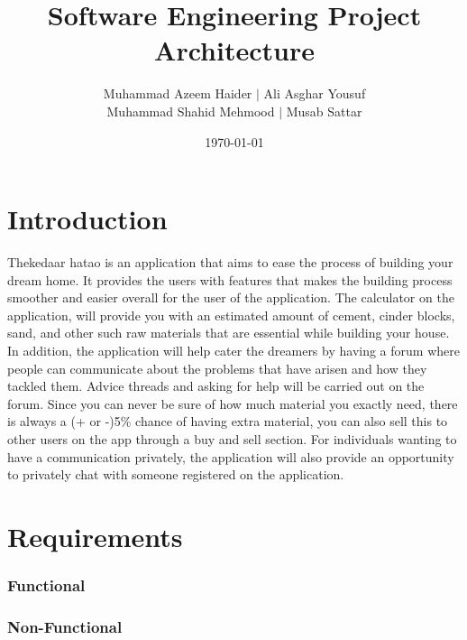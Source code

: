 \documentclass{article}
\title{Software Engineering Project Architecture}
\author{Muhammad Azeem Haider $\mid$ Ali Asghar Yousuf \\
    Muhammad Shahid Mehmood $\mid$ Musab Sattar}
\date{\today}
\begin{document}
\maketitle

\section*{Introduction}

Thekedaar hatao is an application that aims to ease the process of building
your dream home. It provides the users with features that makes the building
process smoother and easier overall for the user of the application. The
calculator on the application, will provide you with an estimated amount of
cement, cinder blocks, sand, and other such raw materials that are essential
while building your house. In addition, the application will help cater the
dreamers by having a forum where people can communicate about the problems that
have arisen and how they tackled them. Advice threads and asking for help will
be carried out on the forum. Since you can never be sure of how much material
you exactly need, there is always a (+ or -)5\% chance of having extra
material, you can also sell this to other users on the app through a buy and
sell section. For individuals wanting to have a communication privately, the
application will also provide an opportunity to privately chat with someone
registered on the application.

\section*{Requirements}

\subsubsection*{Functional}

\subsubsection*{Non-Functional}
\end{document}
